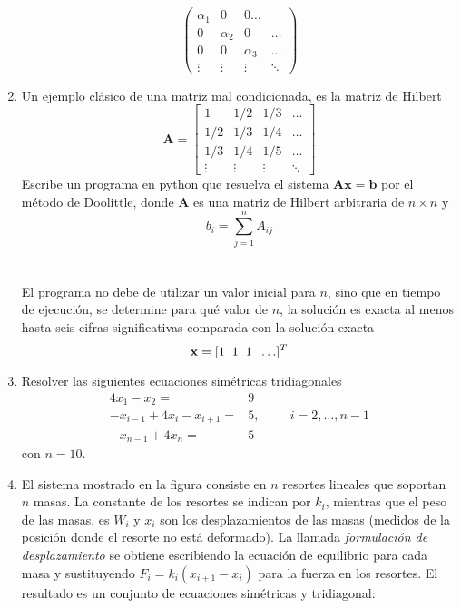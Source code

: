 \documentclass[12pt]{article}
\numberwithin{equation}{section}
\begin{document}
\begin{enumerate}
\[ \begin{pmatrix}
		\alpha_{1} & 0 & 0 \ldots \\
		0 & \alpha_{2} & 0 & \ldots \\
		0 & 0 & \alpha_{3} & \ldots \\
		\vdots & \vdots &\vdots & \ddots
\end{pmatrix} \]
\item Un ejemplo clásico de una matriz mal condicionada, es la matriz de Hilbert
\[ \mathbf{A} = 
	\begin{bmatrix}
		1 & 1/2 & 1/3 & \ldots \\
		1/2 & 1/3 & 1/4 & \ldots \\
		1/3 & 1/4 & 1/5 & \ldots \\
		\vdots & \vdots & \vdots & \ddots
	\end{bmatrix} \]
Escribe un programa en python que resuelva el sistema $\mathbf{A}\mathbf{x} = \mathbf{b}$ por el método de Doolittle, donde $\mathbf{A}$ es una matriz de Hilbert arbitraria de $n \times n$ y \[ b_{i} = \sum_{j=1}^{n} A_{ij} \]
\\
\\
El programa no debe de utilizar un valor inicial para $n$, sino que en tiempo de ejecución, se determine para qué valor de $n$, la solución es exacta al menos hasta seis cifras significativas comparada con la solución exacta
\[\mathbf{x} = [1 \hspace{0.2cm} 1 \hspace{0.2cm} 1 \hspace{0.2cm} \ldots ]^{T} \]
\item Resolver las siguientes ecuaciones simétricas tridiagonales
\[ \begin{split}
4 x_{1} - x_{2} =& 9 \\
-x_{i-1} + 4x_{i} - x_{i+1} =& 5, \hspace{1cm} i=2,\ldots,n-1 \\
-x_{n-1} + 4 x_{n} =& 5
\end{split} \]
con $n=10$.
\item El sistema mostrado en la figura consiste en $n$ resortes lineales que soportan $n$ masas. La constante de los resortes se indican por $k_{i}$, mientras que el peso de las masas, es $W_{i}$ y $x_{i}$ son los desplazamientos de las masas (medidos de la posición donde el resorte no está deformado). La llamada \emph{formulación de desplazamiento} se obtiene escribiendo la ecuación de equilibrio para cada masa y sustituyendo $F_{i} = k_{i}(x_{i+1}-x_{i})$ para la fuerza en los resortes. El resultado es un conjunto de ecuaciones simétricas y tridiagonal:

\end{enumerate}
\end{document}
